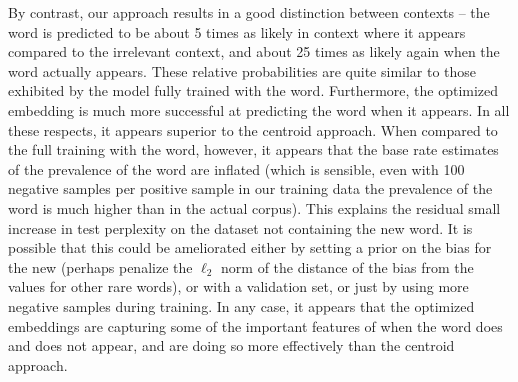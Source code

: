 \documentclass{article}
\begin{document}
By contrast, our approach results in a good distinction between contexts -- the word is predicted to be about 5 times as likely in context where it appears compared to the irrelevant context, and about 25 times as likely again when the word actually appears. These relative probabilities are quite similar to those exhibited by the model fully trained with the word. Furthermore, the optimized embedding is much more successful at predicting the word when it appears. In all these respects, it appears superior to the centroid approach. When compared to the full training with the word, however, it appears that the base rate estimates of the prevalence of the word are inflated (which is sensible, even with 100 negative samples per positive sample in our training data the prevalence of the word is much higher than in the actual corpus). This explains the residual small increase in test perplexity on the dataset not containing the new word. It is possible that this could be ameliorated either by setting a prior on the bias for the new (perhaps penalize the \(\ell_2\) norm of the distance of the bias from the values for other rare words), or with a validation set, or just by using more negative samples during training. In any case, it appears that the optimized embeddings are capturing some of the important features of when the word does and does not appear, and are doing so more effectively than the centroid approach.
\end{document}
